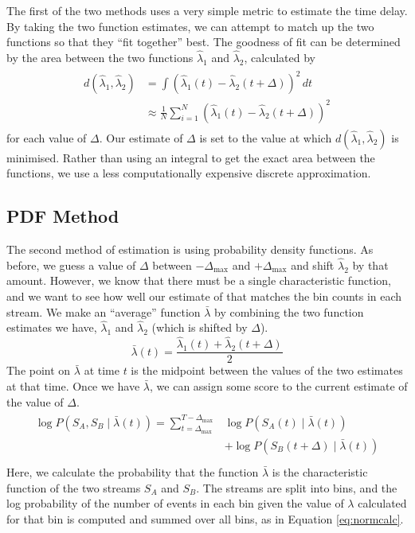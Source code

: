 \documentclass[11pt]{article}
\begin{document}
   The first of the two methods uses a very simple metric to estimate the time
   delay. By taking the two function estimates, we can attempt to match up the
   two functions so that they ``fit together'' best. The goodness of fit can be
   determined by the area between the two functions $\hat{\lambda}_1$ and
   $\hat{\lambda}_2$, calculated by
   \begin{align}
   \begin{split}
   d(\hat{\lambda}_1,\hat{\lambda}_2)&=\int(\hat{\lambda}_1(t)-\hat{\lambda}_2(t+\Delta))^2\,dt\\
   &\approx\frac{1}{N}\sum_{i=1}^N(\hat{\lambda}_1(t)-\hat{\lambda}_2(t+\Delta))^2
   \end{split}
   \end{align}
   for each value of $\Delta$. Our estimate of $\Delta$ is set to the value at
   which $d(\hat{\lambda}_1,\hat{\lambda}_2)$ is minimised. Rather than using an
   integral to get the exact area between the functions, we use a less
   computationally expensive discrete approximation.
\subsection{PDF Method}
\label{sec-5.2}

   The second method of estimation is using probability density functions. As
   before, we guess a value of $\Delta$ between $-\Delta_{\text{max}}$ and
   $+\Delta_{\text{max}}$ and shift $\hat{\lambda}_2$ by that amount. However,
   we know that there must be a single characteristic function, and we want to
   see how well our estimate of that matches the bin counts in each stream. We
   make an ``average'' function $\bar{\lambda}$ by combining the two function
   estimates we have, $\hat{\lambda}_1$ and $\hat{\lambda}_2$ (which is shifted
   by $\Delta$).
   \begin{equation}
   \bar{\lambda}(t)=\frac{\hat{\lambda}_1(t)+\hat{\lambda}_2(t+\Delta)}{2}
   \end{equation}
   The point on $\bar{\lambda}$ at time $t$ is the midpoint between the values of
   the two estimates at that time. Once we have $\bar{\lambda}$, we can assign some
   score to the current estimate of the value of $\Delta$.
   \begin{align}
   \begin{split}
   \log P(S_A,S_B\mid\bar{\lambda}(t))=\sum_{t=\Delta_{\text{max}}}^{T-\Delta_{\text{max}}}&\log P(S_A(t)\mid \bar{\lambda}(t))\\
   &+ \log P(S_B(t+\Delta)\mid \bar{\lambda}(t))\\
   \end{split}
   \end{align}
   Here, we calculate the probability that the function $\bar{\lambda}$ is the
   characteristic function of the two streams $S_A$ and $S_B$. The streams are
   split into bins, and the log probability of the number of events in each bin
   given the value of $\lambda$ calculated for that bin is computed and summed
   over all bins, as in Equation \eqref{eq:normcalc}.
\end{document}
